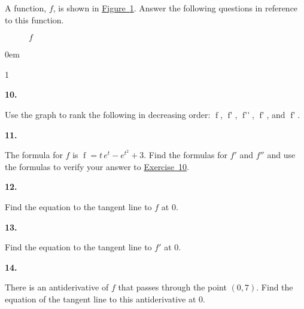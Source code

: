 \documentclass[12pt,]{book}
\theoremstyle{plain}
\theoremstyle{definition}
\numberwithin{equation}{section}
\newenvironment{exercisegroup}%
{\medskip\noindent}%
{\par\bigskip}%
\newlength{\exercisegroupindent}%
\newlength{\exercisegroupitemwidth}%
\newenvironment{exercisegrouplist}%
{\vspace{-\partopsep}%
\begin{adjustwidth}{\exercisegroupindent}{0em}}%
{\end{adjustwidth}%
\vspace{-\partopsep}%
\vspace{\baselineskip}}%
\newenvironment{exercisegroupbycol}[1]%
{\begin{exercisegrouplist}%
\vspace{-\multicolsep}%
\begin{multicols}{#1}%
\setlength{\parindent}{0em}%
\setlength{\exercisegroupitemwidth}{\linewidth}}%
{\end{multicols}%
\vspace{-\multicolsep}%
\end{exercisegrouplist}}%
\newenvironment{exercisegroupitem}[1]%
{\begin{minipage}[t]{\exercisegroupitemwidth}
\vspace{0pt}%
{\bfseries#1}%
\rule{0pt}{\baselineskip}}{\strut%
\end{minipage}%
\hspace{\columnsep}}%
\providecommand\phantomsection{}
\newcommand{\fe}[2]{\mathop{{#1}{\left(#2\right)}}}
\newcommand{\point}[2]{\left(#1,#2\right)}
\newcommand{\fd}[1]{#1'}
\newcommand{\sd}[1]{#1''}
\begin{document}
\begin{exercisegroup}%
A function, \(f\), is shown in \hyperref[figure-chain-rule-exercise]{Figure~\ref*{figure-chain-rule-exercise}}. Answer the following questions in reference to this function.%
\begin{figure}
\centering
{
}
\caption{\(f\)\label{figure-chain-rule-exercise}}
\end{figure}
\par
\begin{exercisegroupbycol}{1}%
\begin{exercisegroupitem}{10. }\phantomsection\hypertarget{exerice-chain-rule-graph}{\null}
Use the graph to rank the following in decreasing order: \(\fe{f}{1}\), \(\fe{\fd{f}}{1}\), \(\fe{\sd{f}}{1}\), \(\fe{\fd{f}}{0}\), and \(\fe{\fd{f}}{-1}\).%
\end{exercisegroupitem}%
\par%
\begin{exercisegroupitem}{11. }\phantomsection\hypertarget{exercise-347}{\null}
The formula for \(f\) is \(\fe{f}{t}=t\,e^t-e^{t^2}+3\). Find the formulas for \(\fd{f}\) and \(\sd{f}\) and use the formulas to verify your answer to \hyperref[exerice-chain-rule-graph]{Exercise~10}.%
\end{exercisegroupitem}%
\par%
\begin{exercisegroupitem}{12. }\phantomsection\hypertarget{exercise-348}{\null}
Find the equation to the tangent line to \(f\) at \(0\).%
\end{exercisegroupitem}%
\par%
\begin{exercisegroupitem}{13. }\phantomsection\hypertarget{exercise-349}{\null}
Find the equation to the tangent line to \(\fd{f}\) at \(0\).%
\end{exercisegroupitem}%
\par%
\begin{exercisegroupitem}{14. }\phantomsection\hypertarget{exercise-350}{\null}
There is an antiderivative of \(f\) that passes through the point \(\point{0}{7}\). Find the equation of the tangent line to this antiderivative at \(0\).%
\end{exercisegroupitem}%
\par%
\end{exercisegroupbycol}%
\end{exercisegroup}%
\typeout{************************************************}
\typeout{************************************************}
\end{document}
